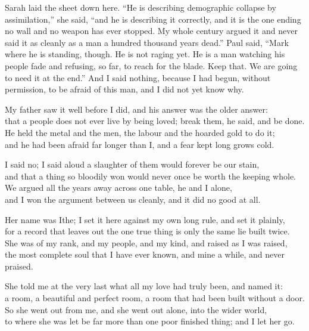 \ornament

Sarah laid the sheet down here. ``He is describing demographic collapse by assimilation,'' she said, ``and he is describing it correctly, and it is the one ending no wall and no weapon has ever stopped. My whole century argued it and never said it as cleanly as a man a hundred thousand years dead.'' Paul said, ``Mark where he is standing, though. He is not raging yet. He is a man watching his people fade and refusing, so far, to reach for the blade. Keep that. We are going to need it at the end.'' And I said nothing, because I had begun, without permission, to be afraid of this man, and I did not yet know why.\par

\ornament

\begin{scripture}
My father saw it well before I did, and his answer was the older answer: \\
that a people does not ever live by being loved; break them, he said, and be done. \\
He held the metal and the men, the labour and the hoarded gold to do it; \\
and he had been afraid far longer than I, and a fear kept long grows cold. \\
\medskip

I said no; I said aloud a slaughter of them would forever be our stain, \\
and that a thing so bloodily won would never once be worth the keeping whole. \\
We argued all the years away across one table, he and I alone, \\
and I won the argument between us cleanly, and it did no good at all. \\
\medskip

Her name was Ithe; I set it here against my own long rule, and set it plainly, \\
for a record that leaves out the one true thing is only the same lie built twice. \\
She was of my rank, and my people, and my kind, and raised as I was raised, \\
the most complete soul that I have ever known, and mine a while, and never praised. \\
\medskip

She told me at the very last what all my love had truly been, and named it: \\
a room, a beautiful and perfect room, a room that had been built without a door. \\
So she went out from me, and she went out alone, into the wider world, \\
to where she was let be far more than one poor finished thing; and I let her go. \\
\medskip


\end{scripture}
